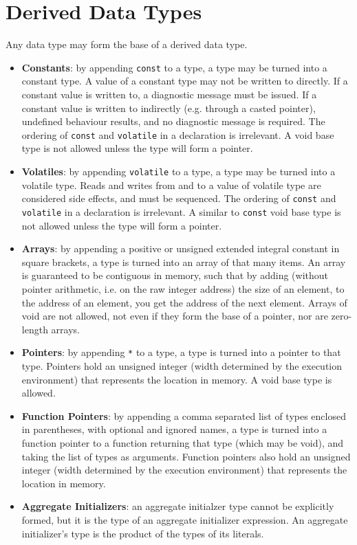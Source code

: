 \documentclass[letterpaper,12pt]{book}
\begin{document}
\section{Derived Data Types}

Any data type may form the base of a derived data type.

\begin{itemize}
	\item \textbf{Constants}: by appending \texttt{const} to a type, a type may be turned into a constant type. A value of a constant type may not be written to directly. If a constant value is written to, a diagnostic message must be issued. If a constant value is written to indirectly (e.g. through a casted pointer), undefined behaviour results, and no diagnostic message is required. The ordering of \texttt{const} and \texttt{volatile} in a declaration is irrelevant. A void base type is not allowed unless the type will form a pointer.
	
	\item \textbf{Volatiles}: by appending \texttt{volatile} to a type, a type may be turned into a volatile type. Reads and writes from and to a value of volatile type are considered side effects, and must be sequenced. The ordering of \texttt{const} and \texttt{volatile} in a declaration is irrelevant. A similar to \texttt{const} void base type is not allowed unless the type will form a pointer.
	
	\item \textbf{Arrays}: by appending a positive or unsigned extended integral constant in square brackets, a type is turned into an array of that many items. An array is guaranteed to be contiguous in memory, such that by adding (without pointer arithmetic, i.e. on the raw integer address) the size of an element, to the address of an element, you get the address of the next element. Arrays of void are not allowed, not even if they form the base of a pointer, nor are zero-length arrays.
	
	\item \textbf{Pointers}: by appending \texttt{*} to a type, a type is turned into a pointer to that type. Pointers hold an unsigned integer (width determined by the execution environment) that represents the location in memory. A void base type is allowed.
	
	\item \textbf{Function Pointers}: by appending a comma separated list of types enclosed in parentheses, with optional and ignored names, a type is turned into a function pointer to a function returning that type (which may be void), and taking the list of types as arguments. Function pointers also hold an unsigned integer (width determined by the execution environment) that represents the location in memory.
	
	\item \textbf{Aggregate Initializers}: an aggregate initialzer type cannot be explicitly formed, but it is the type of an aggregate initializer expression. An aggregate initializer's type is the product of the types of its literals.
\end{itemize}
\end{document}
